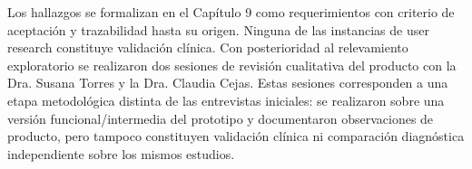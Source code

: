 Los hallazgos se formalizan en el Capítulo 9 como requerimientos con criterio de aceptación y trazabilidad hasta su origen. Ninguna de las instancias de user research constituye validación clínica. Con posterioridad al relevamiento exploratorio se realizaron dos sesiones de revisión cualitativa del producto con la Dra. Susana Torres y la Dra. Claudia Cejas. Estas sesiones corresponden a una etapa metodológica distinta de las entrevistas iniciales: se realizaron sobre una versión funcional/intermedia del prototipo y documentaron observaciones de producto, pero tampoco constituyen validación clínica ni comparación diagnóstica independiente sobre los mismos estudios.
